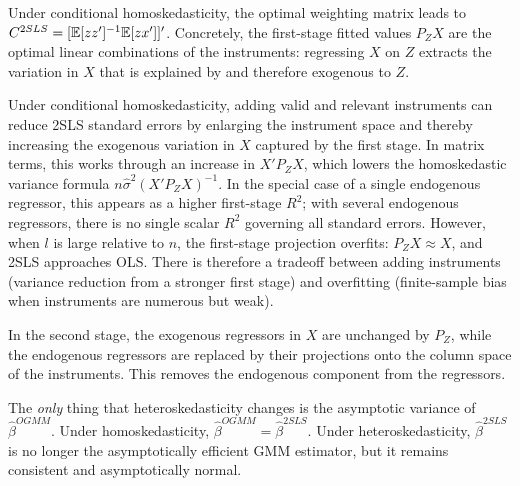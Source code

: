 Under conditional homoskedasticity, the optimal weighting matrix leads to $C^{2SLS} = [\mathbb{E}[zz']^{-1}\mathbb{E}[zx']]'$. Concretely, the first-stage fitted values $P_Z X$ are the optimal linear combinations of the instruments: regressing $X$ on $Z$ extracts the variation in $X$ that is explained by and therefore exogenous to $Z$.

Under conditional homoskedasticity, adding valid and relevant instruments can reduce 2SLS standard errors by enlarging the instrument space and thereby increasing the exogenous variation in $X$ captured by the first stage. In matrix terms, this works through an increase in $X'P_ZX$, which lowers the homoskedastic variance formula $n\hat{\sigma}^2(X'P_ZX)^{-1}$. In the special case of a single endogenous regressor, this appears as a higher first-stage $R^2$; with several endogenous regressors, there is no single scalar $R^2$ governing all standard errors. However, when $l$ is large relative to $n$, the first-stage projection overfits: $P_Z X \approx X$, and 2SLS approaches OLS. There is therefore a tradeoff between adding instruments (variance reduction from a stronger first stage) and overfitting (finite-sample bias when instruments are numerous but weak).

In the second stage, the exogenous regressors in $X$ are unchanged by $P_Z$, while the endogenous regressors are replaced by their projections onto the column space of the instruments. This removes the endogenous component from the regressors.

The \emph{only} thing that heteroskedasticity changes is the asymptotic variance of $\hat{\beta}^{OGMM}$. Under homoskedasticity, $\hat{\beta}^{OGMM} = \hat{\beta}^{2SLS}$. Under heteroskedasticity, $\hat{\beta}^{2SLS}$ is no longer the asymptotically efficient GMM estimator, but it remains consistent and asymptotically normal.

